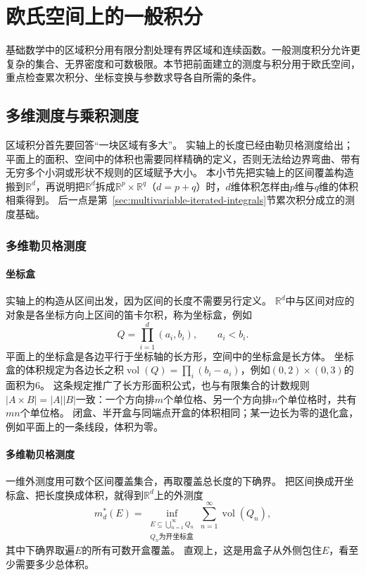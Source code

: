 \section{欧氏空间上的一般积分}
\label{sec:measure-euclidean-integrals}

基础数学中的区域积分用有限分割处理有界区域和连续函数。一般测度积分允许更复杂的集合、无界密度和可数极限。本节把前面建立的测度与积分用于欧氏空间，重点检查累次积分、坐标变换与参数求导各自所需的条件。

\subsection{多维测度与乘积测度}
\label{sec:comb-multidimensional-product-measure}

区域积分首先要回答“一块区域有多大”。
实轴上的长度已经由勒贝格测度给出；平面上的面积、空间中的体积也需要同样精确的定义，否则无法给边界弯曲、带有无穷多个小洞或形状不规则的区域赋予大小。
本小节先把实轴上的区间覆盖构造搬到$\mathbb R^d$，再说明把$\mathbb R^d$拆成$\mathbb R^p\times\mathbb R^q$（$d=p+q$）时，$d$维体积怎样由$p$维与$q$维的体积相乘得到。
后一点是第~\ref{sec:multivariable-iterated-integrals}节累次积分成立的测度基础。

\subsubsection{多维勒贝格测度}

\paragraph{坐标盒}

实轴上的构造从区间出发，因为区间的长度不需要另行定义。
$\mathbb R^d$中与区间对应的对象是各坐标方向上区间的笛卡尔积，称为坐标盒，例如
\[
 Q=\prod_{i=1}^d(a_i,b_i),\qquad a_i<b_i.
\]
平面上的坐标盒是各边平行于坐标轴的长方形，空间中的坐标盒是长方体。
坐标盒的体积规定为各边长之积$\operatorname{vol}(Q)=\prod_i(b_i-a_i)$，例如$(0,2)\times(0,3)$的面积为$6$。
这条规定推广了长方形面积公式，也与有限集合的计数规则$|A\times B|=|A||B|$一致：一个方向排$m$个单位格、另一个方向排$n$个单位格时，共有$mn$个单位格。
闭盒、半开盒与同端点开盒的体积相同；某一边长为零的退化盒，例如平面上的一条线段，体积为零。

\paragraph{多维勒贝格测度}

一维外测度用可数个区间覆盖集合，再取覆盖总长度的下确界。
把区间换成开坐标盒、把长度换成体积，就得到$\mathbb R^d$上的外测度
\[
 m_d^*(E)=\inf_{\substack{E\subseteq\bigcup_{n=1}^{\infty}Q_n\\
 Q_n\text{为开坐标盒}}}\sum_{n=1}^{\infty}\operatorname{vol}(Q_n),
\]
其中下确界取遍$E$的所有可数开盒覆盖。
直观上，这是用盒子从外侧包住$E$，看至少需要多少总体积。


